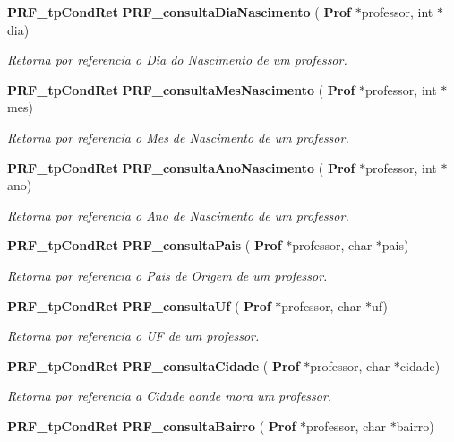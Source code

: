 \begin{Indent}
\begin{DoxyCompactItemize}
\textbf{ P\+R\+F\+\_\+tp\+Cond\+Ret} \textbf{ P\+R\+F\+\_\+consulta\+Dia\+Nascimento} (\textbf{ Prof} $\ast$professor, int $\ast$dia)
\begin{DoxyCompactList}\small\item\em Retorna por referencia o Dia do Nascimento de um professor. \end{DoxyCompactList}\item 
\textbf{ P\+R\+F\+\_\+tp\+Cond\+Ret} \textbf{ P\+R\+F\+\_\+consulta\+Mes\+Nascimento} (\textbf{ Prof} $\ast$professor, int $\ast$mes)
\begin{DoxyCompactList}\small\item\em Retorna por referencia o Mes de Nascimento de um professor. \end{DoxyCompactList}\item 
\textbf{ P\+R\+F\+\_\+tp\+Cond\+Ret} \textbf{ P\+R\+F\+\_\+consulta\+Ano\+Nascimento} (\textbf{ Prof} $\ast$professor, int $\ast$ano)
\begin{DoxyCompactList}\small\item\em Retorna por referencia o Ano de Nascimento de um professor. \end{DoxyCompactList}\item 
\textbf{ P\+R\+F\+\_\+tp\+Cond\+Ret} \textbf{ P\+R\+F\+\_\+consulta\+Pais} (\textbf{ Prof} $\ast$professor, char $\ast$pais)
\begin{DoxyCompactList}\small\item\em Retorna por referencia o Pais de Origem de um professor. \end{DoxyCompactList}\item 
\textbf{ P\+R\+F\+\_\+tp\+Cond\+Ret} \textbf{ P\+R\+F\+\_\+consulta\+Uf} (\textbf{ Prof} $\ast$professor, char $\ast$uf)
\begin{DoxyCompactList}\small\item\em Retorna por referencia o UF de um professor. \end{DoxyCompactList}\item 
\textbf{ P\+R\+F\+\_\+tp\+Cond\+Ret} \textbf{ P\+R\+F\+\_\+consulta\+Cidade} (\textbf{ Prof} $\ast$professor, char $\ast$cidade)
\begin{DoxyCompactList}\small\item\em Retorna por referencia a Cidade aonde mora um professor. \end{DoxyCompactList}\item 
\textbf{ P\+R\+F\+\_\+tp\+Cond\+Ret} \textbf{ P\+R\+F\+\_\+consulta\+Bairro} (\textbf{ Prof} $\ast$professor, char $\ast$bairro)

\end{DoxyCompactItemize}
\end{Indent}
